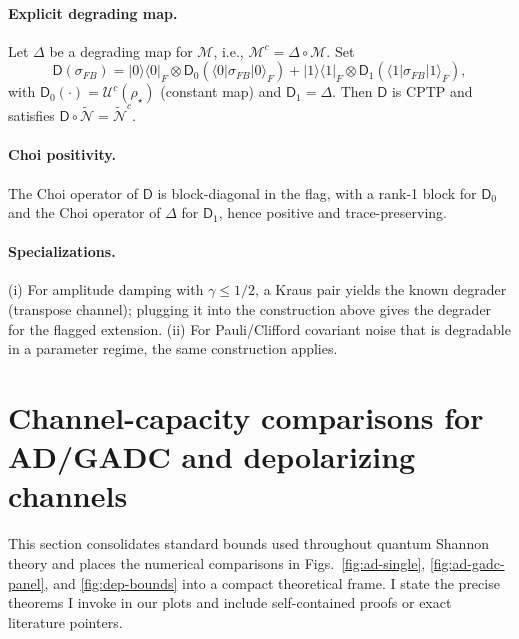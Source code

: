 \documentclass[11pt]{article}
\theoremstyle{plain}
\theoremstyle{definition}
\numberwithin{equation}{section}
\begin{document}
\paragraph{Explicit degrading map.}
Let $\Delta$ be a degrading map for $\mathcal M$, i.e., $\mathcal M^c=\Delta\circ\mathcal M$.
Set
\[
\mathsf D(\sigma_{FB})
= |0\rangle\!\langle 0|_F\otimes \mathsf D_0(\langle 0|\sigma_{FB}|0\rangle_F)
 +|1\rangle\!\langle 1|_F\otimes \mathsf D_1(\langle 1|\sigma_{FB}|1\rangle_F),
\]
with $\mathsf D_0(\cdot)=\mathcal U^c(\rho_\star)$ (constant map) and $\mathsf D_1=\Delta$.
Then $\mathsf D$ is CPTP and satisfies $\mathsf D\circ \widetilde{\mathcal N}=\widetilde{\mathcal N}^c$.

\paragraph{Choi positivity.}
The Choi operator of $\mathsf D$ is block-diagonal in the flag, with a rank-1 block for $\mathsf D_0$ and the Choi operator of $\Delta$ for $\mathsf D_1$, hence positive and trace-preserving.

\paragraph{Specializations.}
(i) For amplitude damping with $\gamma\le 1/2$, a Kraus pair yields the known degrader (transpose channel); plugging it into the construction above gives the degrader for the flagged extension.\newline
(ii) For Pauli/Clifford covariant noise that is degradable in a parameter regime, the same construction applies.



\section{Channel-capacity comparisons for AD/GADC and depolarizing channels}
\label{sec:capacity-comparisons}

This section consolidates standard bounds used throughout quantum Shannon theory
and places the numerical comparisons in Figs.~\ref{fig:ad-single}, \ref{fig:ad-gadc-panel},
and \ref{fig:dep-bounds} into a compact theoretical frame.
I state the precise theorems I invoke in our plots and include
self-contained proofs or exact literature pointers.
\end{document}

